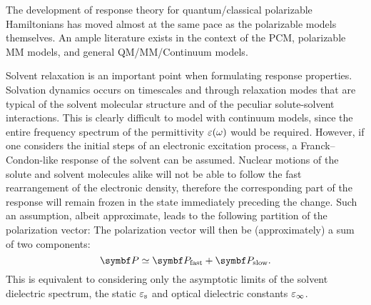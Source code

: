 The development of response theory for quantum/classical polarizable
Hamiltonians has moved almost at the same pace as the polarizable
models themselves.
An ample literature exists in the context of the
\acrshort{PCM},\autocite{Cammi1994-qj, Cammi1996-wf, Cammi1996-vx,
Cammi1999-rb, Cammi2003-qy, Frediani2005-nc, Ferrighi2010-pm}
polarizable \acrshort{MM} models,\autocite{Curutchet2009-bt, Olsen2010-wa,
Lipparini2012-hx, Lipparini2012-tl}
and general \acrshort{QM}/\acrshort{MM}/Continuum models.\autocite{Steindal2011-ki, Caprasecca2012-ir, Lipparini2013-ud}

Solvent relaxation is an important point when formulating response
properties. Solvation dynamics occurs on timescales and through
relaxation modes that are typical of the solvent molecular structure and of the
peculiar solute-solvent interactions.
This is clearly difficult to model with continuum models, since the
entire frequency spectrum of the permittivity $\varepsilon(\omega)$ would be
required.\autocite{Ingrosso2003-ev, Caricato2005-lo,
Mennucci2005-vi, Caricato2006-ba, Corni2015-pe}
However, if one considers the initial steps of an electronic excitation
process, a Franck--Condon-like response of the solvent can be assumed.
Nuclear motions of the solute and solvent molecules alike will not be able to
follow the fast rearrangement of the electronic density, therefore the
corresponding part of the response will remain frozen in the state
immediately preceding the change.
Such an assumption, albeit approximate, leads to the following partition
of the polarization vector:
The polarization vector will then be (approximately) a sum of two
components:
\begin{equation}
 \vect{P} \simeq \vect{P}_\mathrm{fast} + \vect{P}_\mathrm{slow}.
\end{equation}
This is equivalent to considering only the asymptotic limits of the solvent
dielectric spectrum, \ie the static $\varepsilon_\mathrm{s}$ and optical
dielectric constants $\varepsilon_\infty$.\autocite{Aguilar1993-pu, Cammi1995-ah,
Cammi2005-tb, Corni2005-nd}


